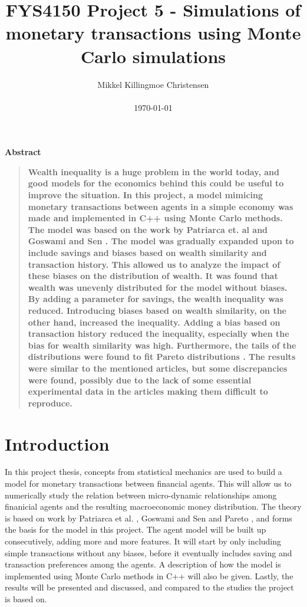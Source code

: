 \documentclass[11pt,a4paper,titlepage]{article}
\title{FYS4150 Project 5 - Simulations of monetary transactions using Monte Carlo simulations}
\author
{Mikkel Killingmoe Christensen\\
\\
\normalsize{\today}
}
\date{}
\newenvironment{sciabstract}{%
\begin{quote} \bf}
{\end{quote}}
\begin{document}
 


\maketitle 


\tableofcontents
\clearpage


\begin{center}
{\large \textbf{Abstract}}
\end{center}
\begin{sciabstract}
Wealth inequality is a huge problem in the world today, and good models  for the economics behind this could be useful to improve the situation. In this project, a model mimicing monetary transactions between agents in a simple economy was made and implemented in C++ using Monte Carlo methods. The model was based on the work by Patriarca et. al \cite{Patriarca} and Goswami and Sen \cite{Goswami}. The model was gradually expanded upon to include savings and biases based on wealth similarity and transaction history. This allowed us to analyze the impact of these biases on the distribution of wealth. It was found that wealth was unevenly distributed for the model without biases. By adding a parameter for savings, the wealth inequality was reduced. Introducing biases based on wealth similarity, on the other hand, increased the inequality.  Adding a bias based on transaction history reduced the inequality, especially when the bias for wealth similarity was high. Furthermore, the tails of the distributions were found to fit Pareto distributions \cite{Pareto}. The results were similar to the mentioned articles, but some discrepancies were found, possibly due to the lack of some essential experimental data in the articles making them difficult to reproduce.  
\end{sciabstract}




\section{Introduction}
In this project thesis, concepts from statistical mechanics are used to build a model for monetary transactions between financial agents. This will allow us to numerically study the relation between micro-dynamic relationships among finanicial agents and the resulting macroeconomic money distribution. The theory is based on work by Patriarca et al. \cite{Patriarca}, Goswami and Sen \cite{Goswami} and Pareto \cite{Pareto}, and forms the basis for the model in this project. The agent model will be built up consecutively, adding more and more features. It will start by only including simple transactions without any biases, before it eventually includes saving and transaction preferences among the agents. A description of how the model is implemented using Monte Carlo methods in C++ will also be given. Lastly, the results will be presented and discussed, and compared to the studies the project is based on. 
\end{document}
